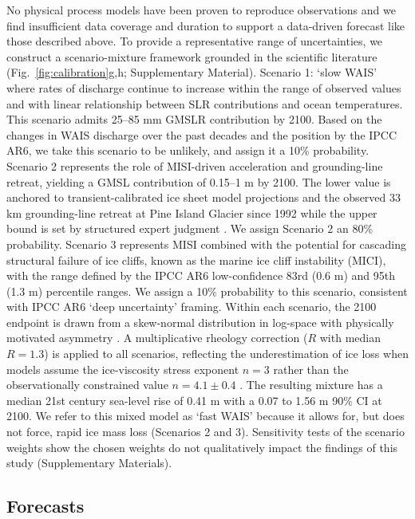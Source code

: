 \documentclass[12pt]{article}
\begin{document}
No physical process models have been proven to reproduce observations \citep{Aschwanden2021} and we find insufficient data coverage and duration to support a data-driven forecast like those described above. To provide a representative range of uncertainties, we construct a scenario-mixture framework grounded in the scientific literature (Fig.~\ref{fig:calibration}g,h; Supplementary Material). Scenario 1: `slow WAIS' where rates of discharge continue to increase within the range of observed values and with linear relationship between SLR contributions and ocean temperatures. This scenario admits 25--85 mm GMSLR contribution by 2100. Based on the changes in WAIS discharge over the past decades and the position by the IPCC AR6, we take this scenario to be unlikely, and assign it a 10\% probability. Scenario 2 represents the role of MISI-driven acceleration and grounding-line retreat, yielding a GMSL contribution of 0.15--1 m by 2100. The lower value is anchored to transient-calibrated ice sheet model projections \citep{Goldberg2026} and the observed 33 km grounding-line retreat at Pine Island Glacier since 1992 \citep{Rignot2026} while the upper bound is set by structured expert judgment \citep{Bamber2019}. We assign Scenario 2 an 80\% probability. Scenario 3 represents MISI combined with the potential for cascading structural failure of ice cliffs, known as the marine ice cliff instability (MICI), with the range defined by the IPCC AR6 low-confidence 83rd (0.6 m) and 95th (1.3 m) percentile ranges. We assign a 10\% probability to this scenario, consistent with IPCC AR6 `deep uncertainty' framing. Within each scenario, the 2100 endpoint is drawn from a skew-normal distribution in log-space with physically motivated asymmetry \citep{Robel2019}. A multiplicative rheology correction ($R$ with median $R = 1.3$) is applied to all scenarios, reflecting the underestimation of ice loss when models assume the ice-viscosity stress exponent $n = 3$ rather than the observationally constrained value $n = 4.1\pm0.4$ \citep{Millstein2022,GetraerMorlighem2025,Martin2026}. The resulting mixture has a median 21st century sea-level rise of 0.41 m with a 0.07 to 1.56 m 90\% CI at 2100. We refer to this mixed model as `fast WAIS' because it allows for, but does not force, rapid ice mass loss (Scenarios 2 and 3). Sensitivity tests of the scenario weights show the chosen weights do not qualitatively impact the findings of this study (Supplementary Materials).

\subsection*{Forecasts}
\end{document}

